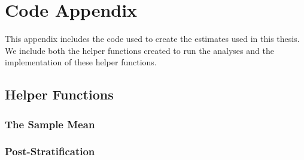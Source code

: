 \documentclass[12pt,twoside]{reedthesis}
\newenvironment{Shaded}{\begin{snugshade}}{\end{snugshade}}
\newcommand{\CommentTok}[1]{\textcolor[rgb]{0.56,0.35,0.01}{\textit{#1}}}
\newcommand{\ControlFlowTok}[1]{\textcolor[rgb]{0.13,0.29,0.53}{\textbf{#1}}}
\newcommand{\DataTypeTok}[1]{\textcolor[rgb]{0.13,0.29,0.53}{#1}}
\newcommand{\KeywordTok}[1]{\textcolor[rgb]{0.13,0.29,0.53}{\textbf{#1}}}
\newcommand{\NormalTok}[1]{#1}
\newcommand{\OperatorTok}[1]{\textcolor[rgb]{0.81,0.36,0.00}{\textbf{#1}}}
\newcommand{\OtherTok}[1]{\textcolor[rgb]{0.56,0.35,0.01}{#1}}
\newcommand{\StringTok}[1]{\textcolor[rgb]{0.31,0.60,0.02}{#1}}
\begin{document}
\appendix

\hypertarget{code-appendix}{%
\chapter{Code Appendix}\label{code-appendix}}

This appendix includes the code used to create the estimates used in this thesis. We include both the helper functions created to run the analyses and the implementation of these helper functions.

\hypertarget{helper-functions}{%
\section{Helper Functions}\label{helper-functions}}

\hypertarget{the-sample-mean}{%
\subsection{The Sample Mean}\label{the-sample-mean}}
\begin{Shaded}
\end{Shaded}
\hypertarget{post-stratification}{%
\subsection{Post-Stratification}\label{post-stratification}}
\end{document}
